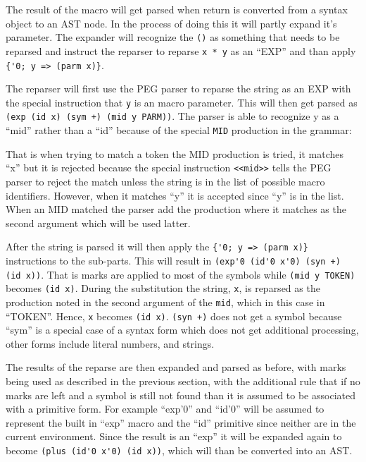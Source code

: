 \documentclass[12pt,english,letterpaper]{article}
\begin{document}
The result of the macro will get parsed when return is converted from a
syntax object to an AST node.  In the process of doing this it will
partly expand it's parameter.  The expander will recognize the \verb/()/
as something that needs to be reparsed and instruct the reparser to reparse
\verb/x * y/ as an ``EXP'' and than apply \verb/{'0; y => (parm x)}/.

The reparser will first use the PEG parser to reparse the string 
as an EXP with the special instruction that \verb/y/ is
an macro parameter.  This will then get parsed as
\verb/(exp (id x) (sym +) (mid y PARM))/.  The parser is able to recognize y
as a ``mid'' rather than a ``id'' because of the special \verb/MID/
production in the grammar:


That is when trying to match a token the MID production is tried, it
matches ``x'' but it is rejected because the special instruction
\verb/<<mid>>/ tells the PEG parser to reject the match unless the
string is in the list of possible macro identifiers.  However, when it
matches ``y'' it is accepted since ``y'' is in the list.  When an MID
matched the parser add the production where it matches as the
second argument which will be used latter.

After the string is parsed it will then apply the
\verb/{'0; y => (parm x)}/ instructions to the sub-parts.  This will
result in \verb/(exp'0 (id'0 x'0) (syn +) (id x))/.  That is marks are
applied to most of the symbols while \verb/(mid y TOKEN)/ becomes
\verb/(id x)/.  During the substitution the string, \verb/x/, is
reparsed as the production noted in the second argument of the
\verb/mid/, which in this case in ``TOKEN''.  Hence, \verb/x/ becomes
\verb/(id x)/.  \verb/(syn +)/ does not get a symbol because ``sym''
is a special case of a syntax form which does not get additional
processing, other forms include literal numbers, and strings.

The results of the reparse are then expanded and parsed as before,
with marks being used as described in the previous section, with the
additional rule that if no marks are left and a symbol is still not
found than it is assumed to be associated with a primitive form.  For
example ``exp'0'' and ``id'0'' will be assumed to represent the built
in ``exp'' macro and the ``id'' primitive since neither are in the
current environment.  Since the result is an ``exp'' it will be
expanded again to become \verb/(plus (id'0 x'0) (id x))/, 
which will than be converted into an AST.
\end{document}
